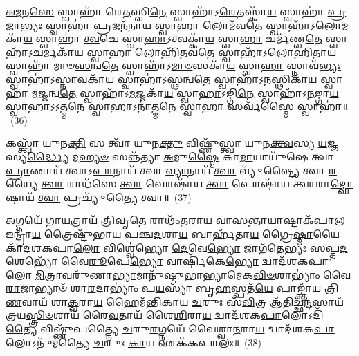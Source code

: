 \-\ul{𑌅}\-\-\ul{𑌮}\-𑌨\-\ul{𑌸𑍇} 𑌸𑍍𑌵𑌾𑌹𑌾᳴ 𑌰𑍇\-\ul{𑌤}\-𑌸𑍍𑌵𑌿\-\ul{𑌨𑍇} 𑌸𑍍𑌵𑌾𑌹𑌾᳴\-𑌽\-\ul{𑌰𑍇}\-𑌤𑌸𑍍𑌕𑌾᳴\-\ul{𑌯} 𑌸𑍍𑌵𑌾𑌹𑌾॑ \ul{𑌪𑍍𑌰}\-𑌜𑌾\-\ul{𑌭𑍍𑌯𑌃} 𑌸𑍍𑌵𑌾𑌹𑌾॑ \ul{𑌪𑍍𑌰}\-𑌜𑌨᳴𑌨𑌾\-\ul{𑌯} 𑌸𑍍𑌵𑌾\-\ul{𑌹𑌾} 𑌲𑍋𑌮᳴𑌵\-\ul{𑌤𑍇} 𑌸𑍍𑌵𑌾𑌹𑌾᳴\-𑌽\-\ul{𑌲𑍋}\-𑌮𑌕𑌾᳴\-\ul{𑌯} 𑌸𑍍𑌵𑌾𑌹𑌾॑ \ul{𑌤𑍍𑌵}\-𑌚𑍇 𑌸𑍍𑌵𑌾\-\ul{𑌹𑌾}\-\-𑌽𑌤𑍍𑌵𑌕𑍍𑌕𑌾᳴\-\ul{𑌯} 𑌸𑍍𑌵𑌾\-\ul{𑌹𑌾} 𑌚𑌰𑍍𑌮᳴𑌣𑍍𑌵\-\ul{𑌤𑍇} 𑌸𑍍𑌵𑌾𑌹𑌾᳴\-𑌽\-\ul{𑌚}\-𑌰𑍍𑌮𑌕𑌾᳴\-\ul{𑌯} 𑌸𑍍𑌵𑌾\-\ul{𑌹𑌾} 𑌲𑍋𑌹𑌿᳴𑌤𑌵\-\ul{𑌤𑍇} 𑌸𑍍𑌵𑌾𑌹𑌾᳴\-𑌽𑌲𑍋\-\ul{𑌹𑌿}\-𑌤𑌾\-\ul{𑌯} 𑌸𑍍𑌵𑌾𑌹𑌾᳴ 𑌮𑌾𑍞\-\ul{𑌸}\-𑌨𑍍𑌵\-\ul{𑌤𑍇} 𑌸𑍍𑌵𑌾𑌹𑌾᳴\-𑌽\-\ul{𑌮𑌾}\-\-\ul{𑍞}\-𑌸𑌕𑌾᳴\-\ul{𑌯} 𑌸𑍍𑌵𑌾\-\ul{𑌹𑌾} 𑌸𑍍𑌨𑌾𑌵᳴\-\ul{𑌭𑍍𑌯𑌃} 𑌸𑍍𑌵𑌾𑌹𑌾॑\-𑌽\-\ul{𑌸𑍍𑌨𑌾}\-𑌵𑌕𑌾᳴\-\ul{𑌯} 𑌸𑍍𑌵𑌾𑌹𑌾॑\-𑌽\-\ul{𑌸𑍍𑌥}\-𑌨𑍍𑌵\-\ul{𑌤𑍇} 𑌸𑍍𑌵𑌾𑌹𑌾᳴\-𑌽\-\ul{𑌨}\-𑌸𑍍𑌥𑌿𑌕𑌾᳴\-\ul{𑌯} 𑌸𑍍𑌵𑌾𑌹𑌾᳴ 𑌮\-\ul{𑌜𑍍𑌜}\-𑌨𑍍𑌵\-\ul{𑌤𑍇} 𑌸𑍍𑌵𑌾𑌹𑌾᳴\-𑌽\-\ul{𑌮}\-𑌜𑍍𑌜𑌕𑌾᳴\-\ul{𑌯} 𑌸𑍍𑌵𑌾\-\ul{𑌹𑌾}\-\-𑌽𑌙𑍍𑌗𑌿\-\ul{𑌨𑍇} 𑌸𑍍𑌵𑌾𑌹𑌾᳴\-𑌽\-\ul{𑌨}\-𑌙𑍍𑌗𑌾\-\ul{𑌯} 𑌸𑍍𑌵𑌾\-\ul{𑌹𑌾}\-\-𑌽\-𑌽𑌤𑍍𑌮\-\ul{𑌨𑍇} 𑌸𑍍𑌵𑌾𑌹𑌾\-𑌽𑌨𑌾॑𑌤𑍍𑌮\-\ul{𑌨𑍇} 𑌸𑍍𑌵𑌾\-\ul{𑌹𑌾} 𑌸𑌰𑍍𑌵᳴\-\ul{𑌸𑍍𑌮𑍈} 𑌸𑍍𑌵𑌾𑌹𑌾॑॥~(36)

{\anuvakamend[{\-\ul{𑌮}\-\-\ul{𑌨}\-𑌸𑍍𑌵𑌿\-\ul{𑌨𑍇} 𑌸𑍍𑌵𑌾𑌹𑌾\-𑌽𑌨𑌾॑𑌤𑍍𑌮\-\ul{𑌨𑍇} 𑌸𑍍𑌵𑌾\-\ul{𑌹𑌾} 𑌦𑍍𑌵𑍇 𑌚᳴}]}%

𑌕𑌸𑍍𑌤𑍍𑌵𑌾᳴ 𑌯𑍁𑌨\-\ul{𑌕𑍍𑌤𑌿} 𑌸 𑌤𑍍𑌵𑌾᳴ 𑌯𑍁𑌨\-\ul{𑌕𑍍𑌤𑍁} 𑌵𑌿𑌷𑍍𑌣𑍁᳴𑌸𑍍𑌤𑍍𑌵𑌾 𑌯𑍁𑌨\-\ul{𑌕𑍍𑌤𑍍𑌵}\-𑌸𑍍𑌯 \ul{𑌯}\-𑌜𑍍𑌞𑌸𑍍𑌯\-\ul{𑌰𑍍𑌦𑍍𑌧𑍍𑌯𑍈} 𑌮\-\ul{𑌹𑍍𑌯}\-\-\ul{𑍞} 𑌸𑌨𑍍𑌨᳴𑌤𑍍𑌯𑌾 \ul{𑌅}\-𑌮𑍁\-\ul{𑌷𑍍𑌮𑍈} 𑌕𑌾\-\ul{𑌮𑌾}\-𑌯𑌾𑌯𑍁᳴𑌷𑍇 𑌤𑍍𑌵𑌾 \ul{𑌪𑍍𑌰𑌾}\-𑌣𑌾𑌯᳴ 𑌤𑍍𑌵𑌾\-𑌽\-\ul{𑌪𑌾}\-𑌨𑌾𑌯᳴ 𑌤𑍍𑌵𑌾 \ul{𑌵𑍍𑌯𑌾}\-𑌨𑌾𑌯᳴ \ul{𑌤𑍍𑌵𑌾} 𑌵𑍍𑌯𑍁᳴𑌷𑍍𑌟𑍍𑌯𑍈 𑌤𑍍𑌵𑌾 \ul{𑌰}\-𑌯𑍍𑌯𑍈 \ul{𑌤𑍍𑌵𑌾} 𑌰𑌾𑌧᳴𑌸𑍇 \ul{𑌤𑍍𑌵𑌾} 𑌘𑍋𑌷𑌾᳴𑌯 \ul{𑌤𑍍𑌵𑌾} 𑌪𑍋𑌷𑌾᳴𑌯 𑌤𑍍𑌵𑌾𑌰𑌾\-\ul{𑌦𑍍𑌘𑍋}\-𑌷𑌾𑌯᳴ \ul{𑌤𑍍𑌵𑌾} 𑌪𑍍𑌰𑌚𑍍𑌯𑍁᳴𑌤𑍍𑌯𑍈 𑌤𑍍𑌵𑌾॥~(37)

{\anuvakamend[{𑌕\-\ul{𑌸𑍍𑌤𑍍𑌵𑌾}\-\-𑌽𑌷𑍍𑌟𑌾𑌤𑍍𑌰𑌿𑍞᳴𑌶𑌤𑍍}]}%

\-\ul{𑌅}\-𑌗𑍍𑌨𑌯𑍇᳴ 𑌗𑌾\-\ul{𑌯}\-𑌤𑍍𑌰𑌾𑌯᳴ \ul{𑌤𑍍𑌰𑌿}\-𑌵𑍃\-\ul{𑌤𑍇} 𑌰𑌾𑌥𑌂᳴𑌤𑌰𑌾𑌯 𑌵𑌾\-\ul{𑌸}\-𑌨𑍍𑌤𑌾\-\ul{𑌯𑌾}\-𑌷𑍍𑌟𑌾𑌕᳴𑌪𑌾\-\ul{𑌲} 𑌇𑌨𑍍𑌦𑍍𑌰𑌾᳴\-\ul{𑌯} 𑌤𑍍𑌰𑍈𑌷𑍍𑌟𑍁᳴𑌭𑌾𑌯 𑌪𑌞𑍍𑌚\-\ul{𑌦}\-𑌶𑌾\-\ul{𑌯} 𑌬𑌾𑌰𑍍\mbox{}𑌹᳴𑌤𑌾\-\ul{𑌯} 𑌗𑍍𑌰𑍈\-\ul{𑌷𑍍𑌮𑌾}\-𑌯𑍈𑌕𑌾᳴\-𑌦𑌶\-𑌕𑌪𑌾\-\ul{𑌲𑍋} 𑌵𑌿𑌶𑍍𑌵𑍇॑𑌭𑍍𑌯𑍋 \ul{𑌦𑍇}\-𑌵𑍇\-\ul{𑌭𑍍𑌯𑍋} 𑌜𑌾𑌗᳴𑌤𑍇𑌭𑍍𑌯𑌃 𑌸𑌪𑍍𑌤\-\ul{𑌦}\-𑌶𑍇𑌭𑍍𑌯𑍋᳴ 𑌵𑍈\-\ul{𑌰𑍂}\-𑌪𑍇\-\ul{𑌭𑍍𑌯𑍋} 𑌵𑌾𑌰𑍍\mbox{}𑌷𑌿᳴𑌕𑍇\-\ul{𑌭𑍍𑌯𑍋} 𑌦𑍍𑌵𑌾𑌦᳴𑌶\-𑌕𑌪𑌾𑌲𑍋 \ul{𑌮𑌿}\-𑌤𑍍𑌰𑌾𑌵𑌰𑍁᳴𑌣𑌾\-\ul{𑌭𑍍𑌯𑌾}\-𑌮𑌾𑌨𑍁᳴𑌷𑍍𑌟𑍁𑌭𑌾𑌭𑍍𑌯𑌾𑌮𑍇𑌕\-\-\ul{𑌵𑌿}\-\-\ul{𑍞}\-𑌶𑌾\-𑌭𑍍𑌯𑌾𑌂॑ 𑌵𑍈\-\ul{𑌰𑌾}\-𑌜𑌾𑌭𑍍𑌯𑌾𑍞᳴ 𑌶𑌾\-\ul{𑌰}\-𑌦𑌾\-𑌭𑍍𑌯𑌾𑌂॑ 𑌪\-\ul{𑌯}\-𑌸𑍍𑌯𑌾᳴ 𑌬𑍃\-\ul{𑌹}\-𑌸𑍍𑌪𑌤᳴\-\ul{𑌯𑍇} 𑌪𑌾𑌙𑍍𑌕𑍍𑌤𑌾᳴𑌯 𑌤𑍍𑌰𑌿\-\ul{𑌣}\-𑌵𑌾𑌯᳴ 𑌶𑌾\-\ul{𑌕𑍍𑌵}\-𑌰𑌾\-\ul{𑌯} 𑌹𑍈𑌮᳴𑌨𑍍𑌤𑌿𑌕𑌾𑌯 \ul{𑌚}\-𑌰𑍁𑌃 𑌸᳴\-\ul{𑌵𑌿}\-𑌤𑍍𑌰 𑌆᳴𑌤𑌿𑌚𑍍𑌛\-\ul{𑌨𑍍𑌦}\-𑌸𑌾𑌯᳴ 𑌤𑍍𑌰𑌯\-\ul{𑌸𑍍𑌤𑍍𑌰𑌿}\-\-\ul{𑍞}\-𑌶𑌾𑌯᳴ 𑌰𑍈\-\ul{𑌵}\-𑌤𑌾𑌯᳴ 𑌶𑍈\-\ul{𑌶𑌿}\-𑌰𑌾\-\ul{𑌯} 𑌦𑍍𑌵𑌾𑌦᳴𑌶\-𑌕\-\ul{𑌪𑌾}\-𑌲𑍋\-𑌽𑌦𑌿᳴\-\ul{𑌤𑍍𑌯𑍈} 𑌵𑌿𑌷𑍍𑌣𑍁᳴𑌪𑌤𑍍𑌨𑍍𑌯𑍈 \ul{𑌚}\-𑌰𑍁\-\ul{𑌰}\-𑌗𑍍𑌨𑌯𑍇᳴ 𑌵𑍈𑌶𑍍𑌵𑌾\-\ul{𑌨}\-𑌰𑌾\-\ul{𑌯} 𑌦𑍍𑌵𑌾𑌦᳴𑌶\-𑌕\-\ul{𑌪𑌾}\-𑌲𑍋\-𑌽𑌨𑍁᳴𑌮𑌤𑍍𑌯𑍈 \ul{𑌚}\-𑌰𑍁𑌃 \ul{𑌕𑌾}\-𑌯 𑌏𑌕᳴𑌕𑌪𑌾𑌲𑌃॥~(38)


